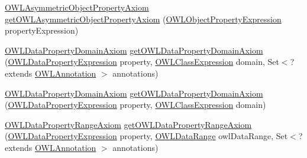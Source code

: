 \begin{DoxyCompactItemize}
\item 
\hyperlink{interfaceorg_1_1semanticweb_1_1owlapi_1_1model_1_1_o_w_l_asymmetric_object_property_axiom}{O\-W\-L\-Asymmetric\-Object\-Property\-Axiom} \hyperlink{classuk_1_1ac_1_1manchester_1_1cs_1_1owl_1_1owlapi_1_1_o_w_l_data_factory_impl_a72da98b8dbb11d5fc501d0a8951ca5f4}{get\-O\-W\-L\-Asymmetric\-Object\-Property\-Axiom} (\hyperlink{interfaceorg_1_1semanticweb_1_1owlapi_1_1model_1_1_o_w_l_object_property_expression}{O\-W\-L\-Object\-Property\-Expression} property\-Expression)
\item 
\hyperlink{interfaceorg_1_1semanticweb_1_1owlapi_1_1model_1_1_o_w_l_data_property_domain_axiom}{O\-W\-L\-Data\-Property\-Domain\-Axiom} \hyperlink{classuk_1_1ac_1_1manchester_1_1cs_1_1owl_1_1owlapi_1_1_o_w_l_data_factory_impl_a33dbe6f0c464005b571a5e401dce9886}{get\-O\-W\-L\-Data\-Property\-Domain\-Axiom} (\hyperlink{interfaceorg_1_1semanticweb_1_1owlapi_1_1model_1_1_o_w_l_data_property_expression}{O\-W\-L\-Data\-Property\-Expression} property, \hyperlink{interfaceorg_1_1semanticweb_1_1owlapi_1_1model_1_1_o_w_l_class_expression}{O\-W\-L\-Class\-Expression} domain, Set$<$?extends \hyperlink{interfaceorg_1_1semanticweb_1_1owlapi_1_1model_1_1_o_w_l_annotation}{O\-W\-L\-Annotation} $>$ annotations)
\item 
\hyperlink{interfaceorg_1_1semanticweb_1_1owlapi_1_1model_1_1_o_w_l_data_property_domain_axiom}{O\-W\-L\-Data\-Property\-Domain\-Axiom} \hyperlink{classuk_1_1ac_1_1manchester_1_1cs_1_1owl_1_1owlapi_1_1_o_w_l_data_factory_impl_a41d9658579f7636ebb8aee61b0bc077d}{get\-O\-W\-L\-Data\-Property\-Domain\-Axiom} (\hyperlink{interfaceorg_1_1semanticweb_1_1owlapi_1_1model_1_1_o_w_l_data_property_expression}{O\-W\-L\-Data\-Property\-Expression} property, \hyperlink{interfaceorg_1_1semanticweb_1_1owlapi_1_1model_1_1_o_w_l_class_expression}{O\-W\-L\-Class\-Expression} domain)
\item 
\hyperlink{interfaceorg_1_1semanticweb_1_1owlapi_1_1model_1_1_o_w_l_data_property_range_axiom}{O\-W\-L\-Data\-Property\-Range\-Axiom} \hyperlink{classuk_1_1ac_1_1manchester_1_1cs_1_1owl_1_1owlapi_1_1_o_w_l_data_factory_impl_a4ae3aed2cd8eacd87ea4b29e2d0cf23f}{get\-O\-W\-L\-Data\-Property\-Range\-Axiom} (\hyperlink{interfaceorg_1_1semanticweb_1_1owlapi_1_1model_1_1_o_w_l_data_property_expression}{O\-W\-L\-Data\-Property\-Expression} property, \hyperlink{interfaceorg_1_1semanticweb_1_1owlapi_1_1model_1_1_o_w_l_data_range}{O\-W\-L\-Data\-Range} owl\-Data\-Range, Set$<$?extends \hyperlink{interfaceorg_1_1semanticweb_1_1owlapi_1_1model_1_1_o_w_l_annotation}{O\-W\-L\-Annotation} $>$ annotations)

\end{DoxyCompactItemize}
